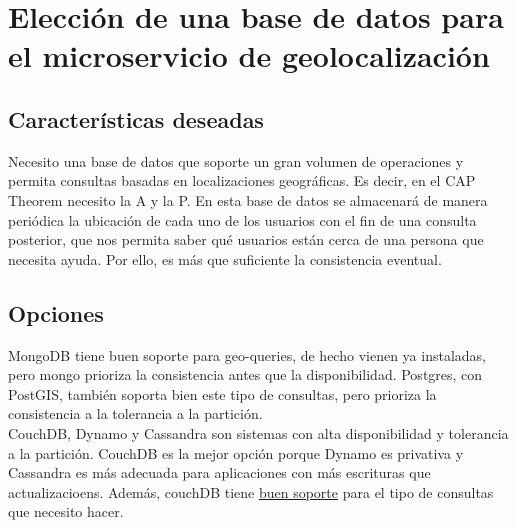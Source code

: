 \chapter{Elección de una base de datos para el microservicio de geolocalización}

\section{Características deseadas}
Necesito una base de datos que soporte un gran volumen de operaciones y permita consultas basadas en localizaciones geográficas. Es decir, en el CAP Theorem necesito la A y la P.
En esta base de datos se almacenará de manera periódica la ubicación de cada uno de los usuarios con el fin de una consulta posterior, que nos permita saber qué usuarios
están cerca de una persona que necesita ayuda. Por ello, es más que suficiente la consistencia eventual.

\section{Opciones}

MongoDB tiene buen soporte para geo-queries, de hecho vienen ya instaladas, pero mongo prioriza la consistencia antes que la disponibilidad. Postgres, con PostGIS, también soporta bien
este tipo de consultas, pero prioriza la consistencia a la tolerancia a la partición. \\
CouchDB, Dynamo y Cassandra son sistemas con alta disponibilidad y tolerancia a la partición. CouchDB es la mejor opción porque Dynamo es privativa y Cassandra es más adecuada para aplicaciones con más
escrituras que actualizacioens. Además, couchDB tiene \href{https://docs.couchbase.com/server/current/fts/fts-geospatial-queries.html}{buen soporte} para el tipo de consultas que necesito hacer.
